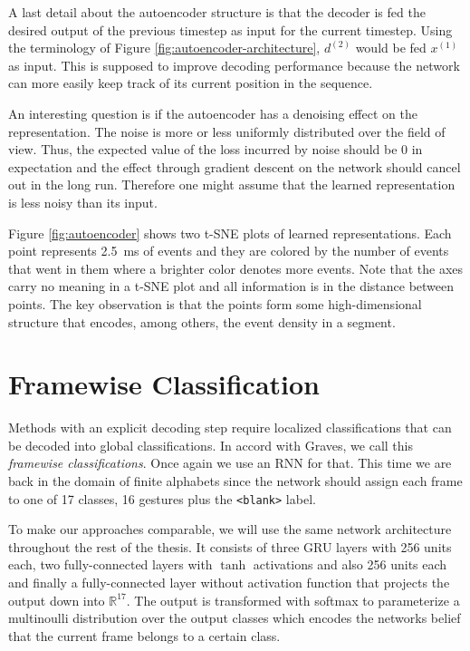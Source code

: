 A last detail about the autoencoder structure is that the decoder is fed the
desired output of the previous timestep as input for the current timestep. Using
the terminology of Figure \ref{fig:autoencoder-architecture}, $d^{(2)}$ would be
fed $x^{(1)}$ as input. This is supposed to improve decoding performance because
the network can more easily keep track of its current position in the sequence. 

An interesting question is if the autoencoder has a denoising effect on the
representation. The noise is more or less uniformly distributed over the field
of view. Thus, the expected value of the loss incurred by noise should be $0$ in
expectation and the effect through gradient descent on the network should cancel
out in the long run. Therefore one might assume that the learned representation
is less noisy than its input.


Figure \ref{fig:autoencoder} shows two t-SNE plots of learned representations.
Each point represents \SI{2.5}{\milli\second} of events and they are colored by
the number of events that went in them where a brighter color denotes more
events. Note that the axes carry no meaning in a t-SNE plot and all information
is in the distance between points. The key observation is that the points form
some high-dimensional structure that encodes, among others, the event density in
a segment.

\section{Framewise Classification}
\label{sec:framewise}

Methods with an explicit decoding step require localized classifications that
can be decoded into global classifications. In accord with Graves, we call this
\emph{framewise classifications}. Once again we use an RNN for that. This time
we are back in the domain of finite alphabets since the network should assign
each frame to one of 17 classes, 16 gestures plus the \texttt{<blank>} label.

To make our approaches comparable, we will use the same network architecture
throughout the rest of the thesis. It consists of three GRU layers with 256
units each, two fully-connected layers with $\tanh$ activations and also 256
units each and finally a fully-connected layer without activation function that
projects the output down into $\mathbb{R}^{17}$. The output is transformed with
softmax to parameterize a multinoulli distribution over the output classes which
encodes the networks belief that the current frame belongs to a certain class.

